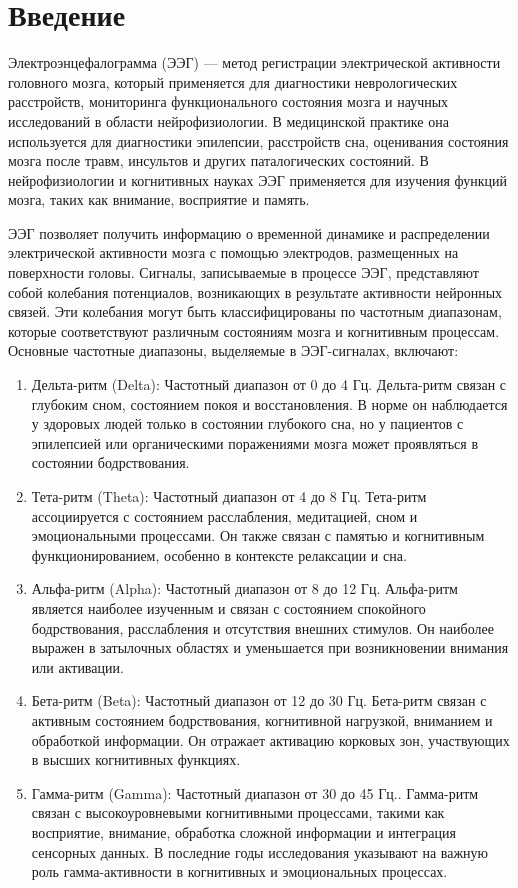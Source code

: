 \chapter*{Введение}
\label{ch:intro}
Электроэнцефалограмма (ЭЭГ) — метод регистрации электрической активности головного мозга, который применяется для диагностики неврологических расстройств, мониторинга функционального состояния мозга и научных исследований в области нейрофизиологии. В медицинской практике она используется для диагностики эпилепсии, расстройств сна, оценивания состояния мозга после травм, инсультов и других паталогических состояний. В нейрофизиологии и когнитивных науках ЭЭГ применяется для изучения функций мозга, таких как внимание, восприятие и память.

ЭЭГ позволяет получить информацию о временной динамике и распределении электрической активности мозга с помощью электродов, размещенных на поверхности головы. Сигналы, записываемые в процессе ЭЭГ, представляют собой колебания потенциалов, возникающих в результате активности нейронных связей. Эти колебания могут быть классифицированы по частотным диапазонам, которые соответствуют различным состояниям мозга и когнитивным процессам. Основные частотные диапазоны, выделяемые в ЭЭГ-сигналах, включают:
\begin{enumerate}
    \item Дельта-ритм (Delta):
    Частотный диапазон от 0 до 4 Гц. Дельта-ритм связан с глубоким сном, состоянием покоя и восстановления. В норме он наблюдается у здоровых людей только в состоянии глубокого сна, но у пациентов с эпилепсией или органическими поражениями мозга может проявляться в состоянии бодрствования.
    \item Тета-ритм (Theta):
     Частотный диапазон от 4 до 8 Гц. Тета-ритм ассоциируется с состоянием расслабления, медитацией, сном и эмоциональными процессами. Он также связан с памятью и когнитивным функционированием, особенно в контексте релаксации и сна.
    \item Альфа-ритм (Alpha):
    Частотный диапазон от 8 до 12 Гц. Альфа-ритм является наиболее изученным и связан с состоянием спокойного бодрствования, расслабления и отсутствия внешних стимулов. Он наиболее выражен в затылочных областях и уменьшается при возникновении внимания или активации.
    \item Бета-ритм (Beta):
    Частотный диапазон от 12 до 30 Гц. Бета-ритм связан с активным состоянием бодрствования, когнитивной нагрузкой, вниманием и обработкой информации. Он отражает активацию корковых зон, участвующих в высших когнитивных функциях.
    \item Гамма-ритм (Gamma):
    Частотный диапазон от 30 до 45 Гц.. Гамма-ритм связан с высокоуровневыми когнитивными процессами, такими как восприятие, внимание, обработка сложной информации и интеграция сенсорных данных. В последние годы исследования указывают на важную роль гамма-активности в когнитивных и эмоциональных процессах.
\end{enumerate}


